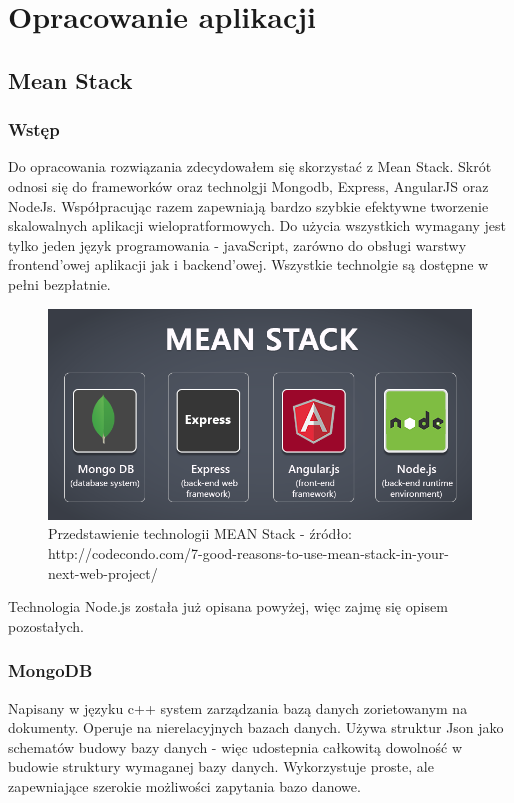 \documentclass[12pt]{report}
\begin{document}
\chapter{Opracowanie aplikacji}

\section{Mean Stack}

\subsection{Wstęp}
Do opracowania rozwiązania zdecydowałem się skorzystać z Mean Stack. 
Skrót odnosi się do frameworków oraz technolgji Mongodb, Express, AngularJS oraz NodeJs. 
Współpracując razem zapewniają bardzo szybkie efektywne tworzenie skalowalnych aplikacji wielopratformowych. 
Do użycia wszystkich wymagany jest tylko jeden język programowania - javaScript, zarówno do obsługi warstwy frontend'owej aplikacji jak i backend'owej. 
Wszystkie technolgie są dostępne w pełni bezpłatnie. 
\begin{figure}[!hb]
\centering
\includegraphics[width=\textwidth,height=\textheight,keepaspectratio]{meanStack.png} 
\caption{Przedstawienie technologii MEAN Stack - źródło: http://codecondo.com/7-good-reasons-to-use-mean-stack-in-your-next-web-project/}
\end{figure}

Technologia Node.js została już opisana powyżej, więc zajmę się opisem pozostałych.

\subsection{MongoDB}
Napisany w języku c++ system zarządzania bazą danych zorietowanym na dokumenty. 
Operuje na nierelacyjnych bazach danych. 
Używa struktur Json jako schematów budowy bazy danych - więc udostepnia całkowitą dowolność w budowie struktury wymaganej bazy danych. 
Wykorzystuje proste, ale zapewniające szerokie możliwości zapytania bazo danowe.
\end{document}
